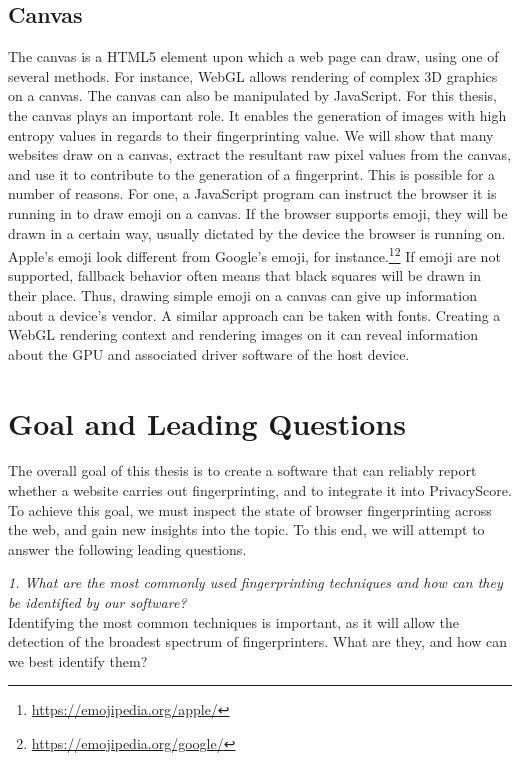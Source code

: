 \documentclass[
    fontsize=12pt,
    headings=small,
    parskip=half,
    bibliography=totoc,
    numbers=noenddot,
    open=any
    ]{scrreprt}
\begin{document}
\subsection{Canvas}
\label{fundamentals:canvas}
The canvas \cite{w3ccanvas} is a HTML5 element upon which a web page can draw,
using one of several methods. For instance, WebGL allows rendering of complex
3D graphics on a canvas.
The canvas can also be manipulated by JavaScript. For this thesis,
the canvas plays an important role. It enables the generation
of images with high entropy values in regards to their fingerprinting value.
We will show that many websites draw on a canvas, extract the resultant raw pixel
values from the canvas, and use it to contribute to the generation of a fingerprint.
This is possible for a number of reasons. For one, a JavaScript program
can instruct the browser it is running in to draw emoji on a canvas.
If the browser supports emoji, they will be drawn in a certain way, usually dictated
by the device the browser is running on. Apple's emoji look different from Google's
emoji, for instance.\footnote{\url{https://emojipedia.org/apple/}}\footnote{\url{https://emojipedia.org/google/}}
If emoji are not supported, fallback behavior often means that black squares will
be drawn in their place.
Thus, drawing simple emoji on a canvas can give up information about a device's vendor.
A similar approach can be taken with fonts.
Creating a WebGL rendering context and rendering images on it can reveal
information about the GPU and associated driver software of the host device.


\section{Goal and Leading Questions}
\label{sec:goal}
The overall goal of this thesis is to create a software that can reliably report whether a website carries out
fingerprinting, and to integrate it into PrivacyScore. To achieve this goal,
we must inspect the state of browser fingerprinting across the web, and gain new insights into the topic.
To this end, we will attempt to answer the following leading questions.

\textit{1. What are the most commonly used fingerprinting techniques and how can they be identified by our software?}\\
Identifying the most common techniques is important, as it will allow the detection of the broadest spectrum
of fingerprinters. What are they, and how can we best identify them?
\end{document}
